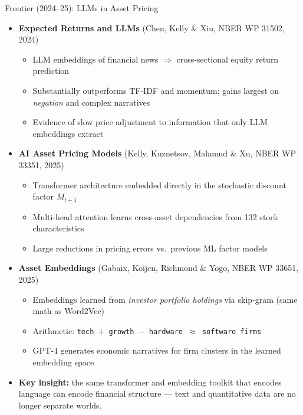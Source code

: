 \documentclass[10pt,english,aspectratio=169]{beamer}
\begin{document}
\begin{frame}{Frontier (2024--25): LLMs in Asset Pricing}
\begin{itemize}
\item \textbf{Expected Returns and LLMs} (Chen, Kelly \& Xiu, NBER WP 31502, 2024)
\begin{itemize}
    \item LLM embeddings of financial news $\Rightarrow$ cross-sectional equity return prediction
    \item Substantially outperforms TF-IDF and momentum; gains largest on \emph{negation} and complex narratives
    \item Evidence of slow price adjustment to information that only LLM embeddings extract
\end{itemize}

\medskip
\item \textbf{AI Asset Pricing Models} (Kelly, Kuznetsov, Malamud \& Xu, NBER WP 33351, 2025)
\begin{itemize}
    \item Transformer architecture embedded directly in the stochastic discount factor $M_{t+1}$
    \item Multi-head attention learns cross-asset dependencies from 132 stock characteristics
    \item Large reductions in pricing errors vs.\ previous ML factor models
\end{itemize}

\medskip
\item \textbf{Asset Embeddings} (Gabaix, Koijen, Richmond \& Yogo, NBER WP 33651, 2025)
\begin{itemize}
    \item Embeddings learned from \emph{investor portfolio holdings} via skip-gram (same math as Word2Vec)
    \item Arithmetic: \texttt{tech $+$ growth $-$ hardware $\approx$ software firms}
    \item GPT-4 generates economic narratives for firm clusters in the learned embedding space
\end{itemize}

\medskip
\item \textbf{Key insight:} the same transformer and embedding toolkit that encodes language can encode financial structure --- text and quantitative data are no longer separate worlds.
\end{itemize}
\end{frame}
\end{document}
